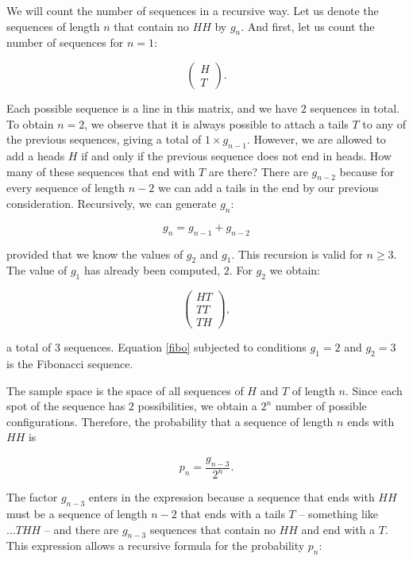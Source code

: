 \documentclass[12pt]{article}
\begin{document}
We will count the number of sequences in a recursive way.
Let us denote the sequences of length $n$ that contain no $HH$ by
$g_{n}$.
And first, let us count the number of sequences for $n=1$:

\begin{equation}
\begin{pmatrix}
H \\
T
\end{pmatrix}.
\end{equation}

\noindent
Each possible sequence is a line in this matrix, and we have $2$ sequences in total.
To obtain $n = 2$, we observe that it is always possible to attach
a tails $T$ to any of the previous sequences, giving a total of $ 1 \times g_{n - 1}$.
However, we are allowed to add a heads $H$ if and only if the previous sequence
does not end in heads. How many of these sequences that end with $T$ are there?
There are $g_{n - 2}$ because for every sequence of length $n-2$ we can add a tails 
in the end by our previous consideration.
Recursively, we can generate $g_{n}$:

\begin{equation} \label{fibo}
g_{n} = g_{n-1} + g_{n-2}
\end{equation}

\noindent
provided that we know the values of $g_{2}$ and $g_{1}$.
This recursion is valid for $n \geq 3$. The value of $g_{1}$
has already been computed, $2$. For $g_{2}$ we obtain:

\begin{equation}
\begin{pmatrix}
H T \\
T T \\
T H
\end{pmatrix},
\end{equation}

\noindent
a total of $3$ sequences.
Equation \eqref{fibo} subjected to conditions $g_1 = 2$ and $g_2 = 3$ 
is the Fibonacci sequence.

The sample space is the space of all sequences of $H$ and $T$ of length
$n$. Since each spot of the sequence has $2$ possibilities, we obtain
a $2^{n}$ number of possible configurations.
Therefore, the probability that a sequence of length $n$ ends with
$HH$ is

\begin{equation}
p_n = \frac{g_{n - 3}}{2^{n}}.
\end{equation}

\noindent
The factor $g_{n - 3}$ enters in the expression because a sequence that ends with
$HH$ must be a sequence of length $n-2$ that ends with a tails $T$ -- something like
$... THH$ -- and there are $g_{n-3}$ sequences that contain no $HH$ and end with a 
$T$. This expression allows a recursive formula for the probability $p_{n}$:
\end{document}
